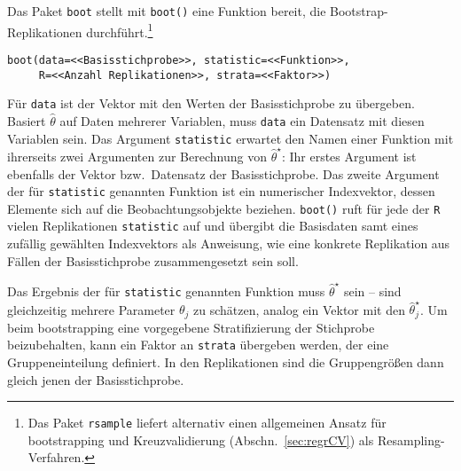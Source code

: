 Das Paket \lstinline!boot! stellt mit \lstinline!boot()! eine Funktion bereit, die Bootstrap-Replikationen durchführt.\footnote{Das Paket  \lstinline!rsample! \cite{Frick2024} liefert alternativ einen allgemeinen Ansatz für bootstrapping und Kreuzvalidierung (Abschn.\ \ref{sec:regrCV}) als Resampling-Verfahren.}
\begin{lstlisting}
boot(data=<<Basisstichprobe>>, statistic=<<Funktion>>,
     R=<<Anzahl Replikationen>>, strata=<<Faktor>>)
\end{lstlisting}

Für \lstinline!data! ist der Vektor mit den Werten der Basisstichprobe zu übergeben. Basiert $\hat{\theta}$ auf Daten mehrerer Variablen, muss \lstinline!data! ein Datensatz mit diesen Variablen sein. Das Argument \lstinline!statistic! erwartet den Namen einer Funktion mit ihrerseits zwei Argumenten zur Berechnung von $\hat{\theta}^{\star}$: Ihr erstes Argument ist ebenfalls der Vektor bzw.\ Datensatz der Basisstichprobe. Das zweite Argument der für \lstinline!statistic! genannten Funktion ist ein numerischer Indexvektor, dessen Elemente sich auf die Beobachtungsobjekte beziehen. \lstinline!boot()! ruft für jede der \lstinline!R! vielen Replikationen \lstinline!statistic! auf und übergibt die Basisdaten samt eines zufällig gewählten Indexvektors als Anweisung, wie eine konkrete Replikation aus Fällen der Basisstichprobe zusammengesetzt sein soll.

Das Ergebnis der für \lstinline!statistic! genannten Funktion muss $\hat{\theta}^{\star}$ sein -- sind gleichzeitig mehrere Parameter $\theta_{j}$ zu schätzen, analog ein Vektor mit den $\hat{\theta}^{\star}_{j}$. Um beim bootstrapping eine vorgegebene Stratifizierung der Stichprobe beizubehalten, kann ein Faktor an \lstinline!strata! übergeben werden, der eine Gruppeneinteilung definiert. In den Replikationen sind die Gruppengrößen dann gleich jenen der Basisstichprobe.

